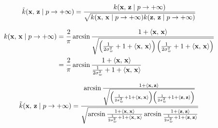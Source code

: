 \begin{equation}
	\tilde{k}(\mathbf{x},\,\mathbf{z} \mid p \to + \infty) = \frac{
		k(\mathbf{x},\,\mathbf{z} \mid p \to + \infty) }{
		\sqrt{
			k(\mathbf{x},\,\mathbf{x} \mid p \to + \infty)
			k(\mathbf{z},\,\mathbf{z} \mid p \to + \infty)
		}
	}
\end{equation}

\begin{align*}
	k(\mathbf{x},\,\mathbf{x} \mid p \to + \infty)
	 & = \frac{2}{\pi}
	\arcsin \frac{1 + \left\langle \mathbf{x},\,\mathbf{x} \right\rangle}{\sqrt{
			\left(
			\frac{1}{2\sigma_w^2} + 1 + \left\langle \mathbf{x},\,\mathbf{x} \right\rangle
			\right)
			\left(
			\frac{1}{2\sigma_w^2} + 1 + \left\langle \mathbf{x},\,\mathbf{x} \right\rangle
			\right)
	}}                 \\
	 & = \frac{2}{\pi}
	\arcsin \frac{1 + \left\langle \mathbf{x},\,\mathbf{x} \right\rangle}{
		\frac{1}{2\sigma_w^2} + 1 + \left\langle \mathbf{x},\,\mathbf{x} \right\rangle
	}                  \\
\end{align*}

\begin{equation}
	\tilde{k}(\mathbf{x},\,\mathbf{z} \mid p \to + \infty) =
	\frac{
		\arcsin \frac{1 + \left\langle \mathbf{x},\,\mathbf{z} \right\rangle}{\sqrt{
				\left(
				\frac{1}{2\sigma_w^2} + 1 + \left\langle \mathbf{x},\,\mathbf{x} \right\rangle
				\right)
				\left(
				\frac{1}{2\sigma_w^2} + 1 + \left\langle \mathbf{z},\,\mathbf{z} \right\rangle
				\right)
			}}
	}{
		\sqrt{
			\arcsin \frac{1 + \left\langle \mathbf{x},\,\mathbf{x} \right\rangle}{
				\frac{1}{2\sigma_w^2} + 1 + \left\langle \mathbf{x},\,\mathbf{x} \right\rangle
			}
			\arcsin \frac{1 + \left\langle \mathbf{z},\,\mathbf{z} \right\rangle}{
				\frac{1}{2\sigma_w^2} + 1 + \left\langle \mathbf{z},\,\mathbf{z} \right\rangle
			}
		}
	}
\end{equation}
